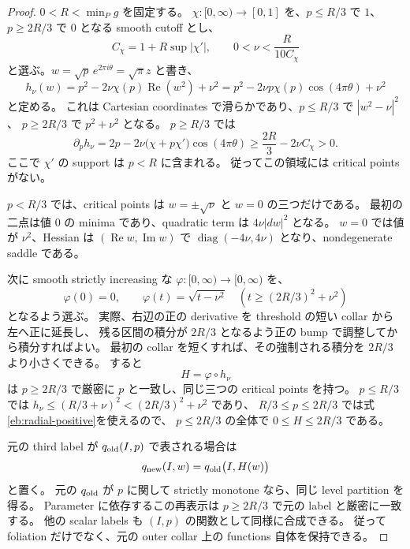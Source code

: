 \begin{proof}
$0<R<\min_P g$ を固定する。
$\chi:[0,\infty)\to[0,1]$ を、$p\le R/3$ で $1$、$p\ge2R/3$ で $0$ となる smooth cutoff とし、
\[
 C_\chi=1+R\sup|\chi'|,\qquad
 0<\nu<\frac{R}{10C_\chi}
\]
と選ぶ。$w=\sqrt p\,e^{2\pi i\theta}=\sqrt\pi z$ と書き、
\begin{equation}\label{eb:morse-function}
 h_\nu(w)=p^2-2\nu\chi(p)\operatorname{Re}(w^2)+\nu^2
         =p^2-2\nu p\chi(p)\cos(4\pi\theta)+\nu^2
\end{equation}
と定める。
これは Cartesian coordinates で滑らかであり、$p\le R/3$ で $|w^2-\nu|^2$、
$p\ge2R/3$ で $p^2+\nu^2$ となる。
$p\ge R/3$ では
\begin{equation}\label{eb:radial-positive}
 \partial_p h_\nu
 =2p-2\nu\bigl(\chi+p\chi'\bigr)\cos(4\pi\theta)
 \ge\frac{2R}{3}-2\nu C_\chi>0.
\end{equation}
ここで $\chi'$ の support は $p<R$ に含まれる。
従ってこの領域には critical points がない。

$p<R/3$ では、critical points は $w=\pm\sqrt\nu$ と $w=0$ の三つだけである。
最初の二点は値 $0$ の minima であり、quadratic term は $4\nu|dw|^2$ となる。
$w=0$ では値が $\nu^2$、Hessian は $(\operatorname{Re}w,\operatorname{Im}w)$ で
$\operatorname{diag}(-4\nu,4\nu)$ となり、nondegenerate saddle である。

次に smooth strictly increasing な $\varphi:[0,\infty)\to[0,\infty)$ を、
\[
 \varphi(0)=0,\qquad
 \varphi(t)=\sqrt{t-\nu^2}\quad
 \left(t\ge (2R/3)^2+\nu^2\right)
\]
となるよう選ぶ。
実際、右辺の正の derivative を threshold の短い collar から左へ正に延長し、
残る区間の積分が $2R/3$ となるよう正の bump で調整してから積分すればよい。
最初の collar を短くすれば、その強制される積分を $2R/3$ より小さくできる。
すると
\[
 H=\varphi\circ h_\nu
\]
は $p\ge2R/3$ で厳密に $p$ と一致し、同じ三つの critical points を持つ。
$p\le R/3$ では $h_\nu\le(R/3+\nu)^2<(2R/3)^2+\nu^2$ であり、
$R/3\le p\le2R/3$ では式\eqref{eb:radial-positive}を使えるので、
$p\le2R/3$ の全体で $0\le H\le2R/3$ である。

元の third label が $q_{\rm old}(I,p)$ で表される場合は
\begin{equation}\label{eb:old-label}
 q_{\rm new}(I,w)=q_{\rm old}\bigl(I,H(w)\bigr)
\end{equation}
と置く。
元の $q_{\rm old}$ が $p$ に関して strictly monotone なら、同じ level partition を得る。
Parameter に依存するこの再表示は $p\ge2R/3$ で元の label と厳密に一致する。
他の scalar labels も $(I,p)$ の関数として同様に合成できる。
従って foliation だけでなく、元の outer collar 上の functions 自体を保持できる。


\end{proof}
